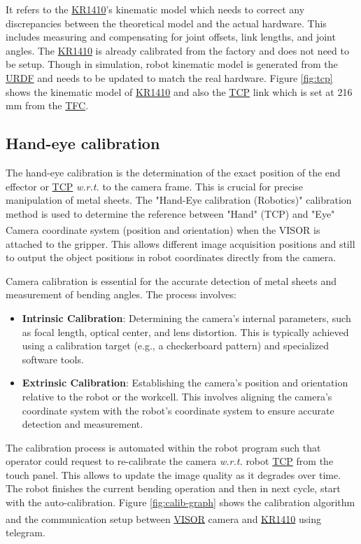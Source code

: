 It refers to the \hyperref[acro:KR]{KR1410}'s kinematic model which needs to correct any discrepancies between the theoretical model and the actual hardware. This includes measuring and compensating for joint offsets, link lengths, and joint angles. 
The \hyperref[acro:KR]{KR1410} is already calibrated from the factory and does not need to be setup. Though in simulation, robot kinematic model is generated from the \hyperref[acro:URDF]{URDF} and needs to be updated to match the real hardware. Figure \ref{fig:tcp} shows the kinematic model of \hyperref[acro:KR]{KR1410} and also the \hyperref[acro:TCP]{TCP} link which is set at 216 mm from the \hyperref[acro:TFC]{TFC}.

\subsection{Hand-eye calibration}
\label{subsubsec:tcp-calibration}
The hand-eye calibration is the determination of the exact position of the end effector or \hyperref[acro:TCP]{TCP} \textit{w.r.t.} to the camera frame. This is crucial for precise manipulation of metal sheets. The "Hand-Eye calibration (Robotics)" calibration method is used to determine the
reference between "Hand" (TCP) and "Eye" Camera coordinate system
(position and orientation) when the VISOR\textsuperscript{\textregistered} is attached to the gripper.
This allows different image acquisition positions and still to output the object positions
in robot coordinates directly from the camera.
\cite[page 102]{visor_user_manual}

Camera calibration is essential for the accurate detection of metal sheets and measurement of bending angles. The process involves:

\begin{itemize}
    \item \textbf{Intrinsic Calibration}: Determining the camera's internal parameters, such as focal length, optical center, and lens distortion. This is typically achieved using a calibration target (e.g., a checkerboard pattern) and specialized software tools.
    \item \textbf{Extrinsic Calibration}: Establishing the camera's position and orientation relative to the robot or the workcell. This involves aligning the camera's coordinate system with the robot's coordinate system to ensure accurate detection and measurement.
\end{itemize}

\vspace{1\baselineskip}
The calibration process is automated within the robot program
such that operator could request to re-calibrate the camera \textit{w.r.t.}
robot \hyperref[acro:TCP]{TCP} from the touch panel. This allows to update the image quality as it degrades over time. 
The robot finishes the current
bending operation and then in next cycle, start with the auto-calibration. Figure \ref{fig:calib-graph} shows the calibration algorithm and the communication setup between \hyperref[acro:VISOR]{VISOR}\textsuperscript{\textregistered} camera and \hyperref[acro:KR]{KR1410} using telegram.

